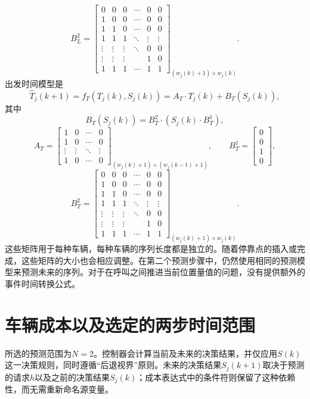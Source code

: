 \documentclass[11pt]{article}
\begin{document}
\[
B_L^2=
\begin{bmatrix}
0&0&0&\cdots&0&0\\
1&0&0&\cdots&0&0\\
1&1&0&\cdots&0&0\\
1&1&1&\ddots&\vdots&\vdots\\
\vdots&\vdots&\vdots&\ddots&0&0\\
\vdots&\vdots&\vdots&&1&0\\
1&1&1&\cdots&1&1
\end{bmatrix}_{(w_j(k)+1)\times w_j(k)}.
\]
出发时间模型是
\begin{equation}
\widehat{T}_j(k+1)=f_T(T_j(k),S_j(k))
=A_T\cdot T_j(k)+B_T(S_j(k)),
\tag{9}
\end{equation}
其中
\[
B_T(S_j(k))=B_T^2\cdot(S_j(k)\cdot B_T^1),
\]
\[
A_T=
\begin{bmatrix}
1&0&\cdots&0\\
1&0&\cdots&0\\
\vdots&\vdots&\ddots&\vdots\\
1&0&\cdots&0
\end{bmatrix}_{(w_j(k)+1)\times(w_j(k-1)+1)},
\qquad
B_T^1=\begin{bmatrix}0\\0\\1\\0\end{bmatrix},
\]
\[
B_T^2=
\begin{bmatrix}
0&0&0&\cdots&0&0\\
1&0&0&\cdots&0&0\\
1&1&0&\cdots&0&0\\
1&1&1&\ddots&\vdots&\vdots\\
\vdots&\vdots&\vdots&\ddots&0&0\\
\vdots&\vdots&\vdots&&1&0\\
1&1&1&\cdots&1&1
\end{bmatrix}_{(w_j(k)+1)\times w_j(k)}.
\]
这些矩阵用于每种车辆，每种车辆的序列长度都是独立的。随着停靠点的插入或完成，这些矩阵的大小也会相应调整。在第二个预测步骤中，仍然使用相同的预测模型来预测未来的序列。对于在呼叫之间推进当前位置量值的问题，没有提供额外的事件时间转换公式。

\section*{车辆成本以及选定的两步时间范围}
所选的预测范围为$N=2$。控制器会计算当前及未来的决策结果，并仅应用$S(k)$这一决策规则，同时遵循“后退视界”原则。未来的决策结果$S_j(k+1)$取决于预测的请求$h$以及之前的决策结果$S_j(k)$；成本表达式中的条件符则保留了这种依赖性，而无需重新命名源变量。
\end{document}
